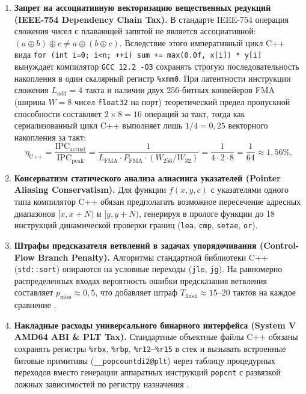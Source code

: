 \documentclass[11pt,a4paper]{article}
\begin{document}
\begin{enumerate}
\setlength{\itemsep}{3pt}\setlength{\parskip}{0pt}
    \item \textbf{Запрет на ассоциативную векторизацию вещественных редукций (IEEE-754 Dependency Chain Tax).} В стандарте IEEE-754 операция сложения чисел с плавающей запятой не является ассоциативной: $(a \oplus b) \oplus c \neq a \oplus (b \oplus c)$. Вследствие этого императивный цикл C++ вида \texttt{for (int i=0; i<n; ++i) sum += max(0.0f, x[i]) * y[i]} вынуждает компилятор \texttt{GCC 12.2 -O3} сохранять строгую последовательность накопления в один скалярный регистр \texttt{\%xmm0}. При латентности инструкции сложения $L_{\text{add}} = 4$ такта и наличии двух 256-битных конвейеров FMA (ширина $W = 8$ чисел \texttt{float32} на порт) теоретический предел пропускной способности составляет $2 \times 8 = 16$ операций за такт, тогда как сериализованный цикл C++ выполняет лишь $1 / 4 = 0{,}25$ векторного накопления за такт:
    \begin{equation}
        \eta_{\text{C++}} = \frac{\text{IPC}_{\text{actual}}}{\text{IPC}_{\text{peak}}} = \frac{1}{L_{\text{FMA}} \cdot P_{\text{FMA}} \cdot (W_{256} / W_{32})} = \frac{1}{4 \cdot 2 \cdot 8} = \frac{1}{64} \approx 1{,}56\%.
    \end{equation}
    \item \textbf{Консерватизм статического анализа алиасинга указателей (Pointer Aliasing Conservatism).} Для функции $f(x, y, c)$ с указателями одного типа компилятор C++ обязан предполагать возможное пересечение адресных диапазонов $[x, x+N)$ и $[y, y+N)$, генерируя в прологе функции до 18 инструкций динамической проверки границ (\texttt{lea}, \texttt{cmp}, \texttt{setae}, \texttt{or}).
    \item \textbf{Штрафы предсказателя ветвлений в задачах упорядочивания (Control-Flow Branch Penalty).} Алгоритмы стандартной библиотеки C++ (\texttt{std::sort}) опираются на условные переходы (\texttt{jle}, \texttt{jg}). На равномерно распределенных входах вероятность ошибки предсказания ветвления составляет $p_{\text{miss}} \approx 0{,}5$, что добавляет штраф $T_{\text{flush}} \approx 15\text{--}20$ тактов на каждое сравнение \cite{mankowitz2023}.
    \item \textbf{Накладные расходы универсального бинарного интерфейса (System V AMD64 ABI \& PLT Tax).} Стандартные объектные файлы C++ обязаны сохранять регистры \texttt{\%rbx}, \texttt{\%rbp}, \texttt{\%r12–\%r15} в стек и вызывать встроенные битовые примитивы (\texttt{\_\_popcountdi2@plt}) через таблицу процедурных переходов вместо генерации аппаратных инструкций \texttt{popcnt} с развязкой ложных зависимостей по регистру назначения \cite{lattner2021, phothilimthana2016}.
\end{enumerate}
\end{document}
